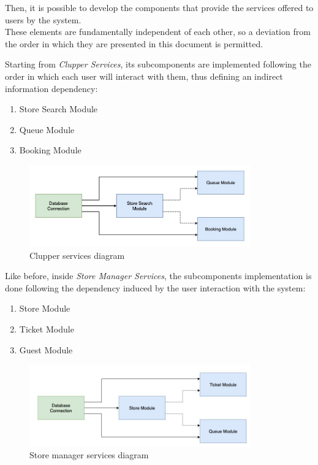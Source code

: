 Then, it is possible to develop the components that provide the services offered to users by the system.\\
These elements are fundamentally independent of each other, so a deviation from the order in which they are presented in this document is permitted.

Starting from \emph{Clupper Services}, its subcomponents are implemented following the order in which each user will interact with them, thus defining an indirect information dependency:
\begin{enumerate}
    \item Store Search Module
    \item Queue Module
    \item Booking Module
\end{enumerate}

\begin{figure}[H]
\centering
\includegraphics[width=0.85\textwidth]{implementation_diagrams/clupper_services_diagram}
\caption{Clupper services diagram}
\end{figure}

Like before, inside \emph{Store Manager Services}, the subcomponents implementation is done following the dependency induced by the user interaction with the system:
\begin{enumerate}
    \item Store Module
    \item Ticket Module
    \item Guest Module
\end{enumerate}

\begin{figure}[H]
\centering
\includegraphics[width=0.85\textwidth]{implementation_diagrams/store_manager_services_diagram}
\caption{Store manager services diagram}
\end{figure}

